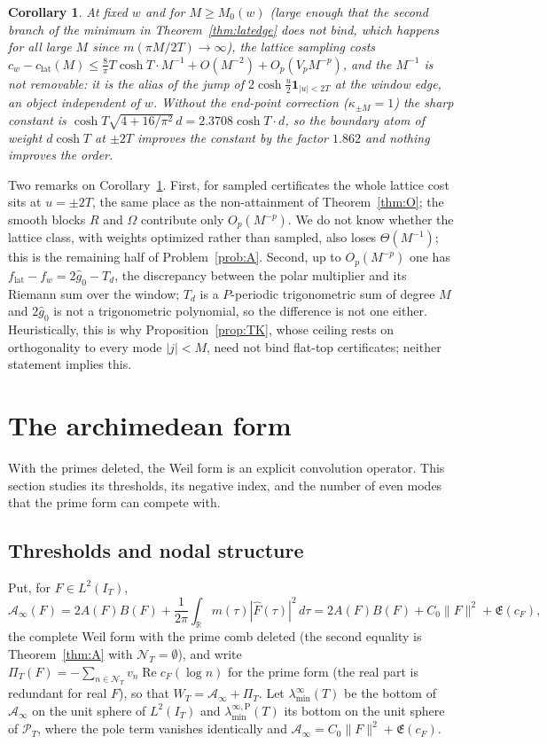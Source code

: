 \documentclass[11pt]{amsart}
\newtheorem{corollary}[theorem]{Corollary}
\theoremstyle{definition}
\theoremstyle{remark}
\newcommand{\R}{\mathbb R}
\newcommand{\Rel}{\operatorname{Re}}
\newcommand{\PT}{\mathcal P_T}
\newcommand{\IT}{I_T}
\newcommand{\gh}[1]{\widehat g_{#1}}
\newcommand{\Fh}{\widehat F}
\newcommand{\cF}{c_F}
\newcommand{\Lev}{\mathfrak E}
\newcommand{\NT}{\mathcal N_T}
\newcommand{\Ainf}{\mathcal A_\infty}
\newcommand{\PiT}{\Pi_T}
\newcommand{\laminf}{\lambda^{\infty}_{\min}}
\newcommand{\laminfP}{\lambda^{\infty,\mathrm P}_{\min}}
\begin{document}
\begin{corollary}\label{cor:ALdef}
At fixed $w$ and for $M\ge M_0(w)$ (large enough that the second branch of the minimum in
Theorem~\ref{thm:latedge} does not bind, which happens for all large $M$ since $m(\pi M/2T)\to\infty$),
the lattice sampling costs
$c_w-c_{\mathrm{lat}}(M)\le\frac8\pi T\cosh T\cdot M^{-1}+O(M^{-2})+O_p(V_pM^{-p})$, and the
$M^{-1}$ is not removable: it is the alias of the jump of $2\cosh\frac u2\mathbf 1_{|u|<2T}$ at the
window edge, an object independent of $w$. Without the end-point correction
\textup{(}$\kappa_{\pm M}=1$\textup{)} the sharp constant is
$\cosh T\sqrt{4+16/\pi^2}\,d=2.3708\cosh T\cdot d$, so the boundary atom of weight $d\cosh T$ at
$\pm2T$ improves the constant by the factor $1.862$ and nothing improves the order.
\end{corollary}

Two remarks on Corollary~\ref{cor:ALdef}. First, for sampled certificates the whole lattice cost
sits at $u=\pm2T$, the same place as the non-attainment of Theorem~\ref{thm:O}; the smooth blocks $R$
and $\Omega$ contribute only $O_p(M^{-p})$. We do not know whether the lattice class, with weights
optimized rather than sampled, also loses $\Theta(M^{-1})$; this is the remaining half of
Problem~\ref{prob:A}. Second, up to $O_p(M^{-p})$ one has $f_{\mathrm{lat}}-f_w=2\gh0-T_d$, the
discrepancy between the polar multiplier and its Riemann sum over the window; $T_d$ is a
$P$-periodic trigonometric sum of degree $M$ and $2\gh0$ is not a trigonometric polynomial, so the
difference is not one either. Heuristically, this is why Proposition~\ref{prop:TK}, whose ceiling
rests on orthogonality to every mode $|j|<M$, need not bind flat-top certificates; neither
statement implies this.

\section{The archimedean form}\label{sec:archstr}

With the primes deleted, the Weil form is an explicit convolution operator. This section studies
its thresholds, its negative index, and the number of even modes that the prime form can compete
with.

\subsection{Thresholds and nodal structure}\label{subsec:arch}

Put, for $F\in L^2(\IT)$,
\[
\Ainf(F)=2A(F)B(F)+\frac1{2\pi}\int_\R m(\tau)|\Fh(\tau)|^2\,d\tau
=2A(F)B(F)+C_0\|F\|^2+\Lev(\cF),
\]
the complete Weil form with the prime comb deleted (the second equality is Theorem~\ref{thm:A} with
$\NT=\emptyset$), and write $\PiT(F)=-\sum_{n\in\NT}v_n\Rel\cF(\log n)$ for the prime form (the real part is redundant for real $F$), so that
$W_T=\Ainf+\PiT$. Let $\laminf(T)$ be the bottom of $\Ainf$ on the unit sphere of $L^2(\IT)$ and
$\laminfP(T)$ its bottom on the unit sphere of $\PT$, where the pole term vanishes identically and
$\Ainf=C_0\|F\|^2+\Lev(\cF)$.
\end{document}

